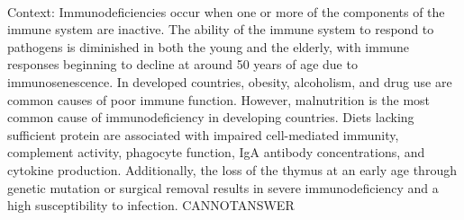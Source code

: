 \documentclass[11pt,a4paper, onecolumn]{article}
\begin{document}
\\ Context: Immunodeficiencies occur when one or more of the components of the immune system are inactive. The ability of the immune system to respond to pathogens is diminished in both the young and the elderly, with immune responses beginning to decline at around 50 years of age due to immunosenescence. In developed countries, obesity, alcoholism, and drug use are common causes of poor immune function. However, malnutrition is the most common cause of immunodeficiency in developing countries. Diets lacking sufficient protein are associated with impaired cell-mediated immunity, complement activity, phagocyte function, IgA antibody concentrations, and cytokine production. Additionally, the loss of the thymus at an early age through genetic mutation or surgical removal results in severe immunodeficiency and a high susceptibility to infection. CANNOTANSWER
\end{document}
